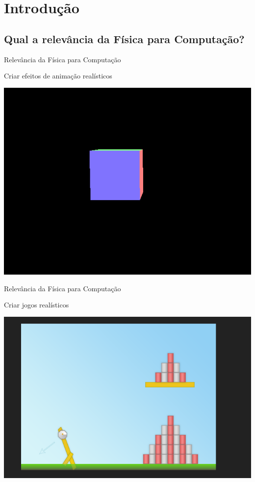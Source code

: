\documentclass[xcolor=dvipsnames,table]{beamer}
\begin{document}
	\section{Introdução}
	
	\subsection{Qual a relevância da Física para Computação?}
	\begin{frame}{Relevância da Física para Computação}
		\begin{block}{Criar efeitos de animação realísticos}
			\begin{center}
	    		\includegraphics[height=.7\textheight]{images/rotacao-cubo.png}
	  		\end{center}
		\end{block}
	\end{frame}
	
	\begin{frame}{Relevância da Física para Computação}
		\begin{block}{Criar jogos realísticos}
			\begin{center}
	    		\includegraphics[height=.7\textheight]{images/slingshot.png}
	  		\end{center}
		\end{block}
	\end{frame}
	
\end{document}
